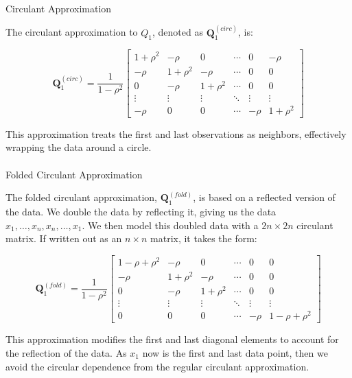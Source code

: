 \documentclass[journal=,manuscript=]{achemso}
\makeatletter
\let\oldparagraph\paragraph
\renewcommand{\paragraph}{
    \@ifstar
      \xxxParagraphStar
      \xxxParagraphNoStar
  }
\newcommand{\xxxParagraphStar}[1]{\oldparagraph*{#1}\mbox{}}
\newcommand{\xxxParagraphNoStar}[1]{\oldparagraph{#1}\mbox{}}
\makeatother
\begin{document}
\paragraph{Circulant Approximation}\label{circulant-approximation}

The circulant approximation to \(Q_1\), denoted as
\(\mathbf{Q}_1^{(circ)}\), is:

\[
\mathbf{Q}_1^{(circ)} = \frac{1}{1-\rho^2}
\begin{bmatrix}
1+\rho^2 & -\rho & 0 & \cdots & 0 & -\rho \\
-\rho & 1+\rho^2 & -\rho & \cdots & 0 & 0 \\
0 & -\rho & 1+\rho^2 & \cdots & 0 & 0 \\
\vdots & \vdots & \vdots & \ddots & \vdots & \vdots \\
-\rho & 0 & 0 & \cdots & -\rho & 1+\rho^2
\end{bmatrix}
\]

This approximation treats the first and last observations as neighbors,
effectively wrapping the data around a circle.

\paragraph{Folded Circulant
Approximation}\label{folded-circulant-approximation}

The folded circulant approximation, \(\mathbf{Q}_1^{(fold)}\), is based
on a reflected version of the data. We double the data by reflecting it,
giving us the data \(x_1,  \dots, x_n, x_n, \dots, x_1\). We then model
this doubled data with a \(2n \times 2n\) circulant matrix. If written
out as an \(n \times n\) matrix, it takes the form:

\[
\mathbf{Q}_1^{(fold)} = \frac{1}{1-\rho^2}
\begin{bmatrix}
1-\rho+\rho^2 & -\rho & 0 & \cdots & 0 & 0 \\
-\rho & 1+\rho^2 & -\rho & \cdots & 0 & 0 \\
0 & -\rho & 1+\rho^2 & \cdots & 0 & 0 \\
\vdots & \vdots & \vdots & \ddots & \vdots & \vdots \\
0 & 0 & 0 & \cdots & -\rho & 1-\rho+\rho^2
\end{bmatrix}
\]

This approximation modifies the first and last diagonal elements to
account for the reflection of the data. As \(x_1\) now is the first and
last data point, then we avoid the circular dependence from the regular
circulant approximation.
\end{document}
